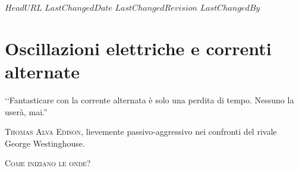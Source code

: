 \svnidlong
{$HeadURL$}
{$LastChangedDate$}
{$LastChangedRevision$}
{$LastChangedBy$}

\chapter{Oscillazioni elettriche e correnti alternate}
\begin{introduction}
	‘‘Fantasticare con la corrente alternata è solo una perdita di tempo. Nessuno la userà, mai.''
	\begin{flushright}
		\textsc{Thomas Alva Edison}, lievemente passivo-aggressivo nei confronti del rivale George Westinghouse.
	\end{flushright}
\end{introduction}
\lettrine[findent=1pt, nindent=0pt]{C}{ome iniziano le onde?} 

